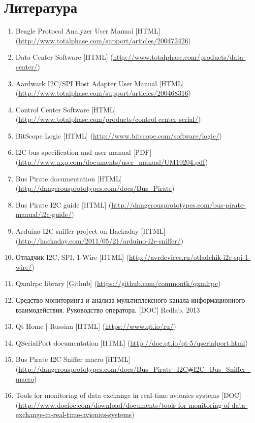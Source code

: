 \section{Литература}

\begin{enumerate}
 \sloppy
 \item \label{beagle_protocol_analyzer} Beagle Protocol Analyzer User Manual [HTML] (\url{http://www.totalphase.com/support/articles/200472426})
 \item \label{tp_data_center} Data Center Software [HTML] (\url{http://www.totalphase.com/products/data-center/})
 \item \label{aardwark_adapter} Aardwark I2C/SPI Host Adapter User Manual [HTML] (\url{http://www.totalphase.com/support/articles/200468316})
 \item \label{tp_control_center} Control Center Software [HTML] (\url{http://www.totalphase.com/products/control-center-serial/})
 \item \label{bitscope_logic} BitScope Logic [HTML] (\url{http://www.bitscope.com/software/logic/})
 \item \label{i2c_protocol_spec} I2C-bus specification and user manual [PDF] (\url{http://www.nxp.com/documents/user_manual/UM10204.pdf})
 \item \label{buspirate_descr} Bus Pirate documentation [HTML] (\url{http://dangerousprototypes.com/docs/Bus_Pirate})
 \item \label{buspirate_i2c} Bus Pirate I2C guide [HTML] (\url{http://dangerousprototypes.com/bus-pirate-manual/i2c-guide/})
 \item \label{arduino-i2c-sniffer} Arduino I2C sniffer project on Hackaday [HTML] (\url{http://hackaday.com/2011/05/21/arduino-i2c-sniffer/})
 \item \label{i2c-spi-1w-debugger} Отладчик I2C, SPI, 1-Wire [HTML] (\url{http://avrdevices.ru/otladchik-i2c-spi-1-wire/})
 \item \label{qxmlrpc} Qxmlrpc library [Github] (\url{https://github.com/commontk/qxmlrpc})
 \item \label{sma_manual} Средство мониторинга и анализа мультиплексного канала информационного взаимодействия. Руководство оператора. [DOC] Redlab, 2013
 \item \label{qt_home} Qt Home | Russian [HTML] (\url{https://www.qt.io/ru/})
 \item \label{qtserialport} QSerialPort documentation [HTML] (\url{http://doc.qt.io/qt-5/qserialport.html})
 \item \label{buspirate_i2c_snif} Bus Pirate I2C Sniffer macro [HTML] (\url{http://dangerousprototypes.com/docs/Bus_Pirate_I2C#I2C_Bus_Sniffer_macro})
 \item \label{monitoring_tools} Tools for monitoring of data exchange in real-time avionics systems [DOC] (\url{http://www.docfoc.com/download/documents/tools-for-monitoring-of-data-exchange-in-real-time-avionics-systems})
\end{enumerate}
